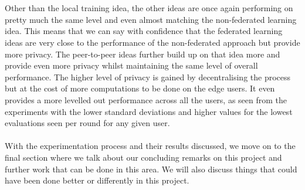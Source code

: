 \documentclass[12pt]{article}
\begin{document}
\\\\
Other than the local training idea, the other ideas are once again performing on pretty much the same level and even almost matching the non-federated learning idea. This means that we can say with confidence that the federated learning ideas are very close to the performance of the non-federated approach but provide more privacy. The peer-to-peer ideas further build up on that idea more and provide even more privacy whilst maintaining the same level of overall performance. The higher level of privacy is gained by decentralising the process but at the cost of more computations to be done on the edge users. It even provides a more levelled out performance across all the users, as seen from the experiments with the lower standard deviations and higher values for the lowest evaluations seen per round for any given user.
\\\\
With the experimentation process and their results discussed, we move on to the final section where we talk about our concluding remarks on this project and further work that can be done in this area. We will also discuss things that could have been done better or differently in this project. 
\clearpage
\end{document}
